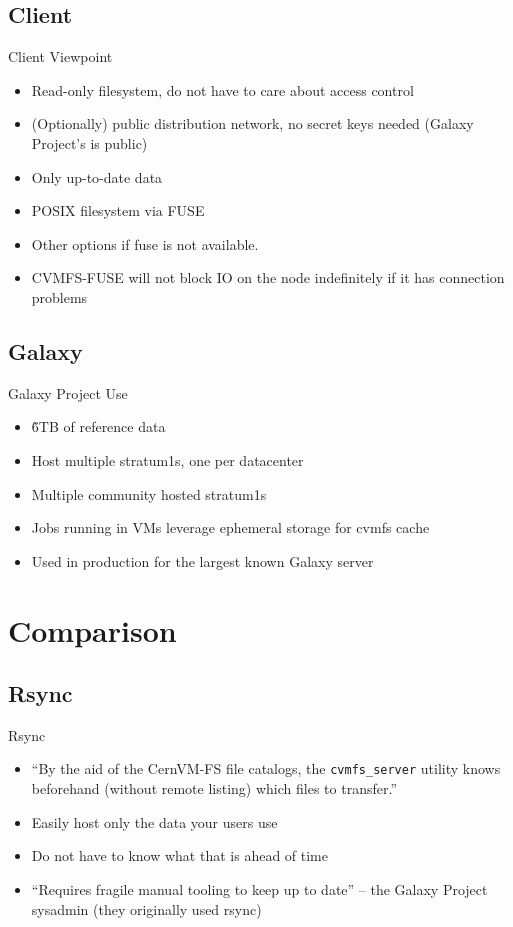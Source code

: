 \documentclass[12pt]{ufrslides}
\begin{document}
\subsection{Client}
\begin{frame}{Client Viewpoint}
	\begin{itemize}
		\item Read-only filesystem, do not have to care about access control
		\item (Optionally) public distribution network, no secret keys needed (Galaxy Project's is public)
		\item Only up-to-date data
		\item POSIX filesystem via FUSE
		\item Other options if fuse is not available.
		\item CVMFS-FUSE will not block IO on the node indefinitely if it has connection problems
	\end{itemize}
\end{frame}

\subsection{Galaxy}
\begin{frame}{Galaxy Project Use}
	\begin{itemize}
		\item \~6TB of reference data
		\item Host multiple stratum1s, one per datacenter
		\item Multiple community hosted stratum1s
		\item Jobs running in VMs leverage ephemeral storage for cvmfs cache
		\item Used in production for the largest known Galaxy server
	\end{itemize}
\end{frame}

\section{Comparison}
\subsection{Rsync}
\begin{frame}{Rsync}
	\begin{itemize}
		\item ``By the aid of the CernVM-FS file catalogs, the \texttt{cvmfs\_server} utility knows beforehand (without remote listing) which files to transfer.''
		\item Easily host only the data your users use
		\item Do not have to know what that is ahead of time
		\item ``Requires fragile manual tooling to keep up to date'' -- the Galaxy Project sysadmin (they originally used rsync)
	\end{itemize}
\end{frame}
\end{document}
